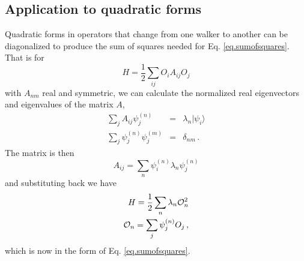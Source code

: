 \subsection{Application to quadratic forms}
\label{sec.quad}
Quadratic forms in operators that change from one walker to another
can be diagonalized to produce the sum of squares needed for
Eq. \ref{eq.sumofsquares}. That is for
\begin{equation}
H = \frac{1}{2} \sum_{ij} O_i A_{ij} O_j
\end{equation}
with $A_{nm}$ real and symmetric, we can calculate the normalized
real eigenvectors and eigenvalues of the matrix $A$,
\begin{eqnarray}
\sum_j A_{ij} \psi_j^{(n)} &=& \lambda_n |\psi_i\rangle
\nonumber\\
\sum_j \psi_j^{(n)} \psi_j^{(m)} &=& \delta_{nm} \,.
\end{eqnarray}
The matrix is then
\begin{equation}
A_{ij} = \sum_n \psi_i^{(n)} \lambda_n\psi_j^{(n)}
\end{equation}
and substituting back we have
\begin{eqnarray}
H = \frac{1}{2} \sum_n \lambda_n {\cal O}_n^2
\nonumber\\
{\cal O}_n = \sum_j \psi_j^{(n)} O_j \,,
\end{eqnarray}
which is now in the form of Eq. \ref{eq.sumofsquares}.

